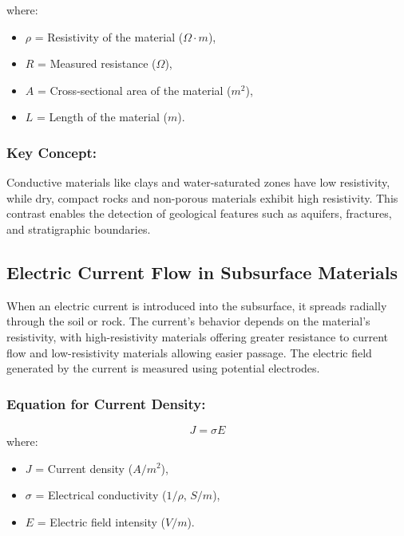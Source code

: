 \documentclass[12pt,a4paper]{report}
\begin{document}
where:
\begin{itemize}
    \item $\rho$ = Resistivity of the material ($\Omega \cdot m$),
    \item $R$ = Measured resistance ($\Omega$),
    \item $A$ = Cross-sectional area of the material ($m^2$),
    \item $L$ = Length of the material ($m$).
\end{itemize}

\subsubsection{Key Concept:}  
Conductive materials like clays and water-saturated zones have low resistivity, while dry, compact rocks and non-porous materials exhibit high resistivity. This contrast enables the detection of geological features such as aquifers, fractures, and stratigraphic boundaries.

\subsection{Electric Current Flow in Subsurface Materials}
When an electric current is introduced into the subsurface, it spreads radially through the soil or rock. The current's behavior depends on the material's resistivity, with high-resistivity materials offering greater resistance to current flow and low-resistivity materials allowing easier passage. The electric field generated by the current is measured using potential electrodes.

\subsubsection{Equation for Current Density:}
\begin{equation}
J = \sigma E
\end{equation}
where:
\begin{itemize}
    \item $J$ = Current density ($A/m^2$),
    \item $\sigma$ = Electrical conductivity ($1/\rho$, $S/m$),
    \item $E$ = Electric field intensity ($V/m$).
\end{itemize}
\end{document}

